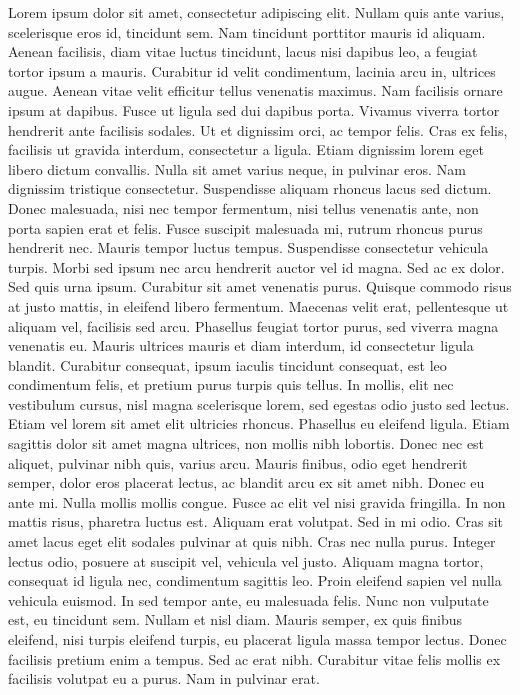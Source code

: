 \begin{newpage}
	Lorem ipsum dolor sit amet, consectetur adipiscing elit. Nullam quis ante varius, scelerisque eros id, tincidunt sem. Nam tincidunt porttitor mauris id aliquam. Aenean facilisis, diam vitae luctus tincidunt, lacus nisi dapibus leo, a feugiat tortor ipsum a mauris. Curabitur id velit condimentum, lacinia arcu in, ultrices augue. Aenean vitae velit efficitur tellus venenatis maximus. Nam facilisis ornare ipsum at dapibus. Fusce ut ligula sed dui dapibus porta. Vivamus viverra tortor hendrerit ante facilisis sodales. Ut et dignissim orci, ac tempor felis. Cras ex felis, facilisis ut gravida interdum, consectetur a ligula.
	Etiam dignissim lorem eget libero dictum convallis. Nulla sit amet varius neque, in pulvinar eros. Nam dignissim tristique consectetur. Suspendisse aliquam rhoncus lacus sed dictum. Donec malesuada, nisi nec tempor fermentum, nisi tellus venenatis ante, non porta sapien erat et felis. Fusce suscipit malesuada mi, rutrum rhoncus purus hendrerit nec. Mauris tempor luctus tempus. Suspendisse consectetur vehicula turpis. Morbi sed ipsum nec arcu hendrerit auctor vel id magna. Sed ac ex dolor. Sed quis urna ipsum. Curabitur sit amet venenatis purus. Quisque commodo risus at justo mattis, in eleifend libero fermentum. Maecenas velit erat, pellentesque ut aliquam vel, facilisis sed arcu. Phasellus feugiat tortor purus, sed viverra magna venenatis eu. Mauris ultrices mauris et diam interdum, id consectetur ligula blandit.
	Curabitur consequat, ipsum iaculis tincidunt consequat, est leo condimentum felis, et pretium purus turpis quis tellus. In mollis, elit nec vestibulum cursus, nisl magna scelerisque lorem, sed egestas odio justo sed lectus. Etiam vel lorem sit amet elit ultricies rhoncus. Phasellus eu eleifend ligula. Etiam sagittis dolor sit amet magna ultrices, non mollis nibh lobortis. Donec nec est aliquet, pulvinar nibh quis, varius arcu. Mauris finibus, odio eget hendrerit semper, dolor eros placerat lectus, ac blandit arcu ex sit amet nibh. Donec eu ante mi. Nulla mollis mollis congue. Fusce ac elit vel nisi gravida fringilla. In non mattis risus, pharetra luctus est. Aliquam erat volutpat. Sed in mi odio. Cras sit amet lacus eget elit sodales pulvinar at quis nibh.
	Cras nec nulla purus. Integer lectus odio, posuere at suscipit vel, vehicula vel justo. Aliquam magna tortor, consequat id ligula nec, condimentum sagittis leo. Proin eleifend sapien vel nulla vehicula euismod. In sed tempor ante, eu malesuada felis. Nunc non vulputate est, eu tincidunt sem. Nullam et nisl diam. Mauris semper, ex quis finibus eleifend, nisi turpis eleifend turpis, eu placerat ligula massa tempor lectus. Donec facilisis pretium enim a tempus. Sed ac erat nibh. Curabitur vitae felis mollis ex facilisis volutpat eu a purus. Nam in pulvinar erat.

\end{newpage}
